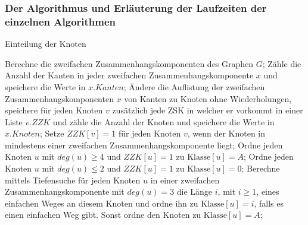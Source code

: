 \subsubsection{Der Algorithmus und Erläuterung der Laufzeiten der einzelnen Algorithmen}
\begin{algorithm}
\caption{Einteilung der Knoten}
\begin{algorithmic}[1]
\vspace{2mm}
\STATE Berechne die zweifachen Zusammenhangskomponenten des Graphen $G$;
 \ENDIF
\STATE Zähle die Anzahl der Kanten in jeder zweifachen Zusammenhangskomponente $x$ und speichere die Werte in $x.Kanten$;
\STATE Ändere die Auflistung der zweifachen Zusammenhangskomponenten $x$ von Kanten zu Knoten ohne Wiederholungen, speichere für jeden Knoten $v$ zusätzlich jede ZSK in welcher er vorkommt in einer Liste $v.ZZK$ und zähle die Anzahl der Knoten und speichere die Werte in $x.Knoten$;
\STATE Setze $ZZK[v]=1$ für jeden Knoten $v$, wenn der Knoten in mindestens einer zweifachen Zusammenhangskomponente liegt;
\STATE Ordne jeden Knoten $u$ mit $deg(u)\geq 4$ und $ZZK[u]=1$ zu $\text{Klasse}[u]=A$;
\STATE Ordne jeden Knoten $u$ mit $deg(u)\leq 2$ und $ZZK[u]=1$ zu $\text{Klasse}[u]=0$;
\STATE Berechne mittels Tiefensuche für jeden Knoten $u$ in einer zweifachen Zusammenhangskomponente mit $deg(u)=3$ die Länge $i$, mit $i \geq 1$, eines einfachen Weges an diesem Knoten und ordne ihn zu $\text{Klasse}[u]=i$, falls es einen einfachen Weg gibt. Sonst ordne den Knoten zu $\text{Klasse}[u]=A$;
{}
\ENDFOR
\vspace{2mm}
\end{algorithmic}
\label{alginit}
\end{algorithm}
